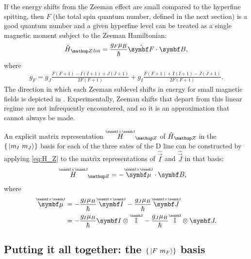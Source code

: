 If the energy shifts from the Zeeman effect are small compared to the hyperfine spitting, then $F$ (the total spin quantum number, defined in the next section) is a good quantum number and a given hyperfine level can be treated as a single magnetic moment subject to the Zeeman Hamiltonian:
\begin{align}
\hat H_\up{Z\,lin} = \frac{g_F\mu_B}{\hbar} \hat{\vec F} \cdot \vec B,
\end{align}
where \cite{steck_rubidium_2015}
\begin{align}
g_F = g_J\frac{F(F+1) - I(I+1) + J(J+1)}{2F(F+1)}
    + g_I\frac{F(F+1) + I(I+1) - J(J+1)}{2F(F+1)}.
\end{align}
The direction in which each Zeeman sublevel shifts in energy for small magnetic fields is depicted in . Experimentally, Zeeman shifts that depart from this linear regime are not infrequently encountered, and so it is an approximation that cannot always be made.

An explicit matrix representation $\oversetIJ{H}_\up{Z}$ of $\hat H_\up{Z}$ in the $\{\ket{m_I\ m_J}\}$ basis for each of the three sates of the D line can be constructed by applying \eqref{eq:H_Z} to the matrix representations of $\hat{\vec I}$ and $\hat{\vec J}$ in that basis: 
\begin{align}\label{eq:Zeeman_hamiltonian}
\oversetIJ{H}_\up{Z} &= -\oversetIJ{\vec\mu}\cdot \vec B,
\end{align}
where
\begin{align}\label{eq:magnetic_moment_operator}
\oversetIJ{\vec\mu} &=
-\frac{g_I\mu_B}{\hbar} \oversetIJ{\vec I}
- \frac{g_J\mu_B}{\hbar} \oversetIJ{\vec J}\\
&= -\frac{g_I\mu_B}{\hbar} \vec I \otimes \oversetJ{\mathbb{I}}
- \frac{g_J\mu_B}{\hbar} \oversetI{\mathbb{I}} \otimes \vec J.
\end{align}

\subsection{Putting it all together: the $\{\ket{F\ m_F}\}$ basis}

